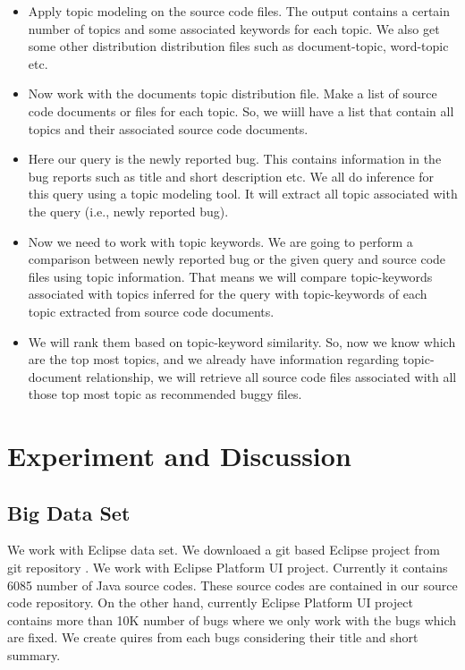\documentclass{sig-alternate}
\begin{document}
\begin{itemize}
\itemsep 0em
\item Apply topic modeling on the source code files. The output contains a certain number of topics and some associated keywords for each topic. We also get some other distribution distribution files such as document-topic, word-topic etc.
\item Now work with the documents topic distribution file. Make a list of source code documents or files for each topic. So, we wiill have a list that contain all topics and their associated source code documents.
\item Here our query is the newly reported bug. This contains information in the bug reports such as title and short description etc. We all do inference for this query using a topic modeling tool. It will extract all topic associated with the query (i.e., newly reported bug).
\item Now we need to work with topic keywords. We are going to perform a comparison between newly reported bug or the given query and source code files using topic information. That means we will compare topic-keywords associated with topics inferred for the query with topic-keywords of each topic extracted from source code documents.
\item We will rank them based on topic-keyword similarity. So, now we know which are the top most topics, and we already have information regarding topic-document relationship, we will retrieve all source code files associated with all those top most topic as recommended buggy files.
\end{itemize}
\section{Experiment and Discussion}
\subsection {Big Data Set}
We work with Eclipse data set. We downloaed a git based Eclipse project from git repository \cite{eclipseGit}. We work with Eclipse Platform UI project. Currently it contains 6085 number of Java source codes. These source codes are contained in our source code repository. On the other hand, currently Eclipse Platform UI project contains more than 10K number of bugs where we only work with the bugs which are fixed. We create quires from each bugs considering their title and short summary.
\end{document}
